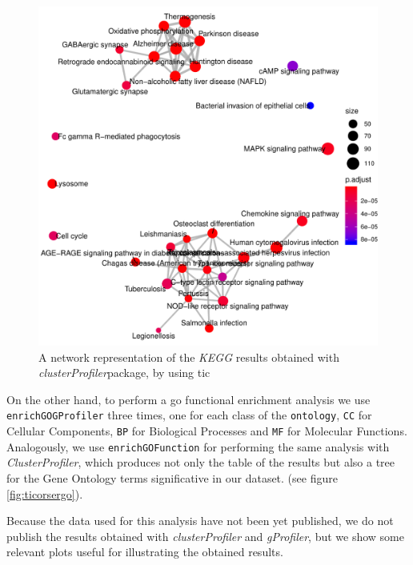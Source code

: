 \begin{figure}[H]
\centering
\includegraphics[width=\textwidth, keepaspectratio]{img/ticorser/functional/net_kegg.pdf}
\caption[ticorser pathway network]{A network representation of the \textit{KEGG} results obtained with \textit{clusterProfiler}package, by using \gls{tic}}
\label{fig:ticorserpathmap}
\end{figure}

On the other hand, to perform a \gls{go} functional enrichment analysis we use \lstinline!enrichGOGProfiler! three times, one for each class of the \lstinline!ontology!, \lstinline!CC! for Cellular Components, \lstinline!BP! for Biological Processes and \lstinline!MF! for Molecular Functions.
Analogously, we use \lstinline!enrichGOFunction! for performing the same analysis with \textit{ClusterProfiler}, which produces not only the table of the results but also a tree for the Gene Ontology terms significative in our dataset. (see figure \ref{fig:ticorsergo}).

Because the data used for this analysis have not been yet published, we do not publish the results obtained with \textit{clusterProfiler} and \textit{gProfiler}, but we show some relevant plots useful for illustrating the obtained results.

